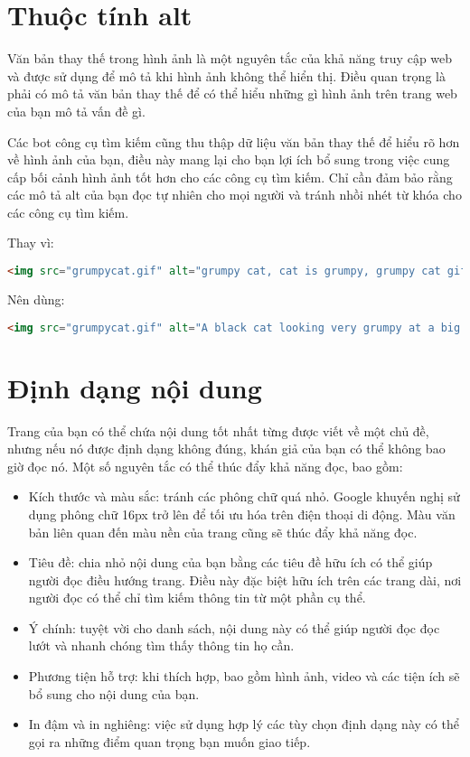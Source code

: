 \section{Thuộc tính alt}
Văn bản thay thế trong hình ảnh là một nguyên tắc của khả năng truy cập web và được sử dụng để mô tả khi hình ảnh không thể hiển thị. Điều quan trọng là phải có mô tả văn bản thay thế để có thể hiểu những gì hình ảnh trên trang web của bạn mô tả vấn đề gì.
\par
Các bot công cụ tìm kiếm cũng thu thập dữ liệu văn bản thay thế để hiểu rõ hơn về hình ảnh của bạn, điều này mang lại cho bạn lợi ích bổ sung trong việc cung cấp bối cảnh hình ảnh tốt hơn cho các công cụ tìm kiếm. Chỉ cần đảm bảo rằng các mô tả alt của bạn đọc tự nhiên cho mọi người và tránh nhồi nhét từ khóa cho các công cụ tìm kiếm.
\par
Thay vì:
\begin{lstlisting}[language=html]
<img src="grumpycat.gif" alt="grumpy cat, cat is grumpy, grumpy cat gif">
\end{lstlisting}
\par
Nên dùng:
\begin{lstlisting}[language=html]
<img src="grumpycat.gif" alt="A black cat looking very grumpy at a big spotted dog">
\end{lstlisting}
\section{Định dạng nội dung}
Trang của bạn có thể chứa nội dung tốt nhất từng được viết về một chủ đề, nhưng nếu nó được định dạng không đúng, khán giả của bạn có thể không bao giờ đọc nó. Một số nguyên tắc có thể thúc đẩy khả năng đọc, bao gồm:
\begin{itemize}
	\item Kích thước và màu sắc: tránh các phông chữ quá nhỏ. Google khuyến nghị sử dụng phông chữ 16px trở lên để tối ưu hóa trên điện thoại di động. Màu văn bản liên quan đến màu nền của trang cũng sẽ thúc đẩy khả năng đọc.
	\item Tiêu đề: chia nhỏ nội dung của bạn bằng các tiêu đề hữu ích có thể giúp người đọc điều hướng trang. Điều này đặc biệt hữu ích trên các trang dài, nơi người đọc có thể chỉ tìm kiếm thông tin từ một phần cụ thể.
	\item Ý chính: tuyệt vời cho danh sách, nội dung này có thể giúp người đọc đọc lướt và nhanh chóng tìm thấy thông tin họ cần.
	\item Phương tiện hỗ trợ: khi thích hợp, bao gồm hình ảnh, video và các tiện ích sẽ bổ sung cho nội dung của bạn.
	\item In đậm và in nghiêng: việc sử dụng hợp lý các tùy chọn định dạng này có thể gọi ra những điểm quan trọng bạn muốn giao tiếp.
\end{itemize}
